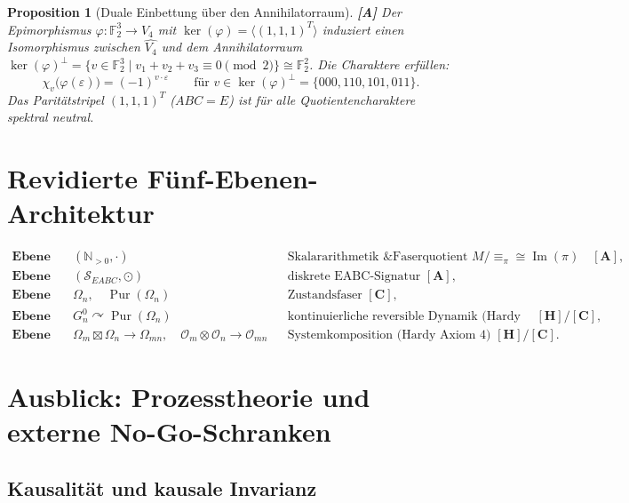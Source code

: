 \documentclass[11pt,a4paper,reqno]{amsart}
\newtheorem{proposition}[theorem]{Proposition}
\theoremstyle{definition}
\theoremstyle{remark}
\newcommand{\F}{\mathbb{F}}
\newcommand{\Pur}{\operatorname{Pur}}
\begin{document}
	\begin{proposition}[Duale Einbettung \"uber den Annihilatorraum] \textbf{[A]}
		Der Epimorphismus $\varphi: \F_2^3 \to V_4$ mit $\operatorname{ker}(\varphi) = \langle (1,1,1)^T \rangle$ induziert einen Isomorphismus zwischen $\widehat{V_4}$ und dem Annihilatorraum $\operatorname{ker}(\varphi)^\perp = \{ v \in \F_2^3 \mid v_1 + v_2 + v_3 \equiv 0 \pmod 2 \} \cong \F_2^2$. Die Charaktere erf\"ullen:
		\begin{equation}
			\boxed{ \chi_v\bigl(\varphi(\varepsilon)\bigr) = (-1)^{v \cdot \varepsilon} \qquad \text{f\"ur } v \in \operatorname{ker}(\varphi)^\perp = \{000, 110, 101, 011\}. }
		\end{equation}
		Das Parit\"atstripel $(1,1,1)^T$ ($ABC = E$) ist f\"ur alle Quotientencharaktere spektral neutral.
	\end{proposition}
	
	\section{Revidierte F\"unf-Ebenen-Architektur}
	
	\begin{align}
		\textbf{Ebene 0:}\quad & (\mathbb{N}_{>0}, \cdot) && \text{Skalararithmetik \& Faserquotient } M/{\equiv_\pi} \cong \operatorname{Im}(\pi) \quad \mathbf{[A]}, \\
		\textbf{Ebene 1:}\quad & (\mathcal{S}_{EABC}, \odot) && \text{diskrete EABC-Signatur } \mathbf{[A]}, \\
		\textbf{Ebene 2:}\quad & \Omega_n, \quad \Pur(\Omega_n) && \text{Zustandsfaser } \mathbf{[C]}, \\
		\textbf{Ebene 3:}\quad & G_n^0 \curvearrowright \Pur(\Omega_n) && \text{kontinuierliche reversible Dynamik (Hardy Axiom 5) } \mathbf{[H]/[C]}, \\
		\textbf{Ebene 4:}\quad & \Omega_m \boxtimes \Omega_n \to \Omega_{mn}, \quad \mathcal{O}_m \otimes \mathcal{O}_n \to \mathcal{O}_{mn} && \text{Systemkomposition (Hardy Axiom 4) } \mathbf{[H]/[C]}.
	\end{align}
	
	\section{Ausblick: Prozesstheorie und externe No-Go-Schranken}
	
	\subsection{Kausalit\"at und kausale Invarianz}
	
\end{document}
